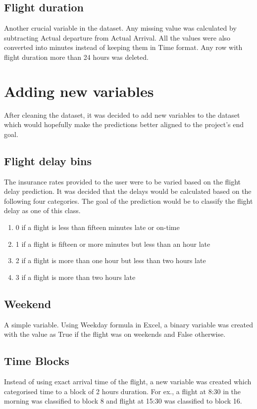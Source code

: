 \subsection{Flight duration}
Another crucial variable in the dataset. Any missing value was calculated by subtracting Actual departure from Actual Arrival. All the values were also converted into minutes instead of keeping them in Time format. Any row with flight duration more than 24 hours was deleted.

\section{Adding new variables}
After cleaning the dataset, it was decided to add new variables to the dataset which would hopefully make the predictions better aligned to the project's end goal.

\subsection{Flight delay bins}
The insurance rates provided to the user were to be varied based on the flight delay prediction. It was decided that the delays would be calculated based on the following four categories. The goal of the prediction would be to classify the flight delay as one of this class.
\begin{enumerate}
    \item 0 if a flight is less than fifteen minutes late or on-time
    \item 1 if a flight is fifteen or more minutes but less than an hour late
    \item 2 if a flight is more than one hour but less than two hours late
    \item 3 if a flight is more than two hours late
\end{enumerate}

\subsection{Weekend}
A simple variable. Using Weekday formula in Excel, a binary variable was created with the value as True if the flight was on weekends and False otherwise.

\subsection{Time Blocks}
Instead of using exact arrival time of the flight, a new variable was created which categorised time to a block of 2 hours duration. For ex., a flight at 8:30 in the morning was classified to block 8 and flight at 15:30 was classified to block 16.

